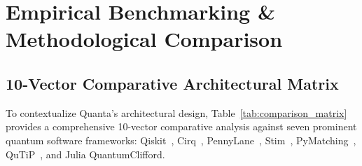 \documentclass[aps,prx,twocolumn,superscriptaddress,nofootinbib]{revtex4-2}
\begin{document}
\section{Empirical Benchmarking \& Methodological Comparison}
\label{sec:benchmarks}

\subsection{10-Vector Comparative Architectural Matrix}
\label{subsec:comparative_matrix}

To contextualize Quanta's architectural design, Table~\ref{tab:comparison_matrix} provides a comprehensive 10-vector comparative analysis against seven prominent quantum software frameworks: Qiskit~\cite{qiskit2019framework}, Cirq~\cite{cirq2020developers}, PennyLane~\cite{pennylane2018bergholm}, Stim~\cite{stim2021gidney}, PyMatching~\cite{higgott2022pymatching}, QuTiP~\cite{qutip2012johansson}, and Julia QuantumClifford.
\end{document}
